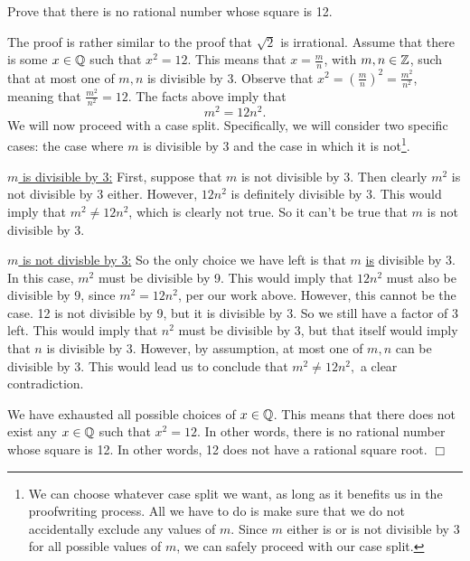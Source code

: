 \newpage
\vspace{5mm}
Prove that there is no rational number whose square is 12.


\vspace{2mm}
\solve
The proof is rather similar to the proof that $\sqrt2$ is irrational.
Assume that there is some $x \in \mathbb{Q}$ such that $x^2= 12$.
This means that $x = \frac{m}{n}$, with $m, n \in \mathbb{Z}$, such that at most one of $m, n$ is divisible by 3.
Observe that $x^2 = (\frac{m}{n})^2 = \frac{m^2}{n^2}$, meaning that $\frac{m^2}{n^2} = 12$.
The facts above imply that 
$$m^2 = 12n^2.$$
We will now proceed with a case split.
Specifically, we will consider two specific cases: the case where $m$ is divisible by 3 and the case in which it is not\footnote{
We can choose whatever case split we want, as long as it benefits us in the proofwriting process.
All we have to do is make sure that we do not accidentally exclude any values of $m$.
Since $m$ either is or is not divisible by 3 for all possible values of $m$, we can safely proceed with our case split.
}.

\vspace{2mm}
\noindent
\underline{$m$ is divisible by 3:}
First, suppose that $m$ is not divisible by 3.
Then clearly $m^2$ is not divisible by 3 either.
However, $12n^2$ is definitely divisible by 3.
This would imply that $m^2 \neq 12n^2$, which is clearly not true.
So it can't be true that $m$ is not divisible by 3.

\vspace{2mm}
\noindent
\underline{$m$ is not divisble by 3:}
So the only choice we have left is that $m$ \underline{is} divisible by 3.
In this case, $m^2$ must be divisible by 9.
This would imply that $12n^2$ must also be divisible by 9, since $m^2 = 12n^2$, per our work above.
However, this cannot be the case.
12 is not divisible by 9, but it is divisible by 3.
So we still have a factor of 3 left.
This would imply that $n^2$ must be divisible by 3, but that itself would imply that $n$ is divisible by 3.
However, by assumption, at most one of $m, n$ can be divisible by 3.
This would lead us to conclude that
$m^2 \neq 12n^2,$
a clear contradiction.

We have exhausted all possible choices of $x \in \mathbb{Q}$.
This means that there does not exist any $x \in \mathbb{Q}$ such that $x^2 = 12$.
In other words, there is no rational number whose square is 12.
In other words, 12 does not have a rational square root. 
$\Box$


